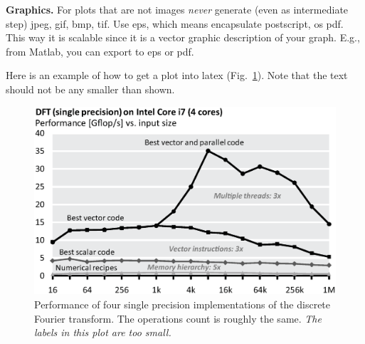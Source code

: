 \documentclass[letterpaper]{article}
\newcommand{\mypar}[1]{{\bf #1.}}
\begin{document}
\mypar{Graphics} For plots that are not images {\em never} generate (even as intermediate step)
jpeg, gif, bmp, tif. Use eps, which means encapsulate postscript, os pdf. This way it is
scalable since it is a vector graphic description of your graph. E.g.,
from Matlab, you can export to eps or pdf.

Here is an example of how to get a plot into latex
(Fig.~\ref{fftperf}). Note that the text should not be any smaller than shown.

\begin{figure}\centering
  \includegraphics[scale=0.33]{dft-performance.eps}
  \caption{Performance of four single precision implementations of the
  discrete Fourier transform. The operations count is roughly the
  same. {\em The labels in this plot are too small.}\label{fftperf}}
\end{figure}





\end{document}
